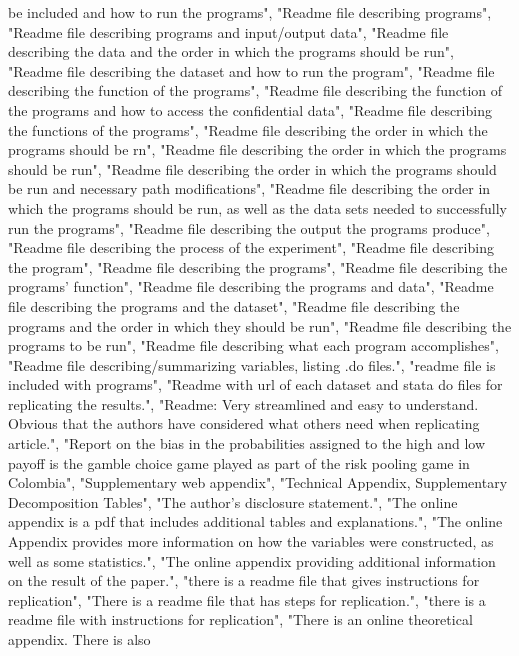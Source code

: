 \documentclass[]{article}
\begin{document}
\begin{itemize}
  be included and how to run the programs", "Readme file describing
  programs", "Readme file describing programs and input/output data",
  "Readme file describing the data and the order in which the programs
  should be run", "Readme file describing the dataset and how to run the
  program", "Readme file describing the function of the programs",
  "Readme file describing the function of the programs and how to access
  the confidential data", "Readme file describing the functions of the
  programs", "Readme file describing the order in which the programs
  should be rn", "Readme file describing the order in which the programs
  should be run", "Readme file describing the order in which the
  programs should be run and necessary path modifications", "Readme file
  describing the order in which the programs should be run, as well as
  the data sets needed to successfully run the programs", "Readme file
  describing the output the programs produce", "Readme file describing
  the process of the experiment", "Readme file describing the program",
  "Readme file describing the programs", "Readme file describing the
  programs' function", "Readme file describing the programs and data",
  "Readme file describing the programs and the dataset", "Readme file
  describing the programs and the order in which they should be run",
  "Readme file describing the programs to be run", "Readme file
  describing what each program accomplishes", "Readme file
  describing/summarizing variables, listing .do files.", "readme file is
  included with programs", "Readme with url of each dataset and stata do
  files for replicating the results.", "Readme: Very streamlined and
  easy to understand. Obvious that the authors have considered what
  others need when replicating article.", "Report on the bias in the
  probabilities assigned to the high and low payoff is the gamble choice
  game played as part of the risk pooling game in Colombia",
  "Supplementary web appendix", "Technical Appendix, Supplementary
  Decomposition Tables", "The author's disclosure statement.", "The
  online appendix is a pdf that includes additional tables and
  explanations.", "The online Appendix provides more information on how
  the variables were constructed, as well as some statistics.", "The
  online appendix providing additional information on the result of the
  paper.", "there is a readme file that gives instructions for
  replication", "There is a readme file that has steps for
  replication.", "there is a readme file with instructions for
  replication", "There is an online theoretical appendix. There is also

\end{itemize}
\end{document}
